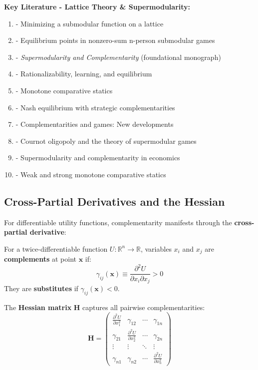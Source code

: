 \textbf{Key Literature - Lattice Theory \& Supermodularity:}
\begin{enumerate}[noitemsep]
    \item \citet{topkis1978} - Minimizing a submodular function on a lattice
    \item \citet{topkis1979} - Equilibrium points in nonzero-sum n-person submodular games
    \item \citet{topkis1998} - \textit{Supermodularity and Complementarity} (foundational monograph)
    \item \citet{milgrom1990} - Rationalizability, learning, and equilibrium
    \item \citet{milgrom1994} - Monotone comparative statics
    \item \citet{vives1990} - Nash equilibrium with strategic complementarities
    \item \citet{vives2005} - Complementarities and games: New developments
    \item \citet{amir1996} - Cournot oligopoly and the theory of supermodular games
    \item \citet{amir2005} - Supermodularity and complementarity in economics
    \item \citet{shannon1995} - Weak and strong monotone comparative statics
\end{enumerate}

\subsection{Cross-Partial Derivatives and the Hessian}
\label{subsec:cross-partial}

For differentiable utility functions, complementarity manifests through the \textbf{cross-partial derivative}:

\begin{definition}
For a twice-differentiable function $U: \mathbb{R}^n \to \mathbb{R}$, variables $x_i$ and $x_j$ are \textbf{complements} at point $\mathbf{x}$ if:
\begin{equation}
\gamma_{ij}(\mathbf{x}) \equiv \frac{\partial^2 U}{\partial x_i \partial x_j} > 0
\label{eq:local-complementarity}
\end{equation}
They are \textbf{substitutes} if $\gamma_{ij}(\mathbf{x}) < 0$.
\end{definition}

The \textbf{Hessian matrix} $\mathbf{H}$ captures all pairwise complementarities:
\begin{equation}
\mathbf{H} = \begin{pmatrix}
\frac{\partial^2 U}{\partial x_1^2} & \gamma_{12} & \cdots & \gamma_{1n} \\
\gamma_{21} & \frac{\partial^2 U}{\partial x_2^2} & \cdots & \gamma_{2n} \\
\vdots & \vdots & \ddots & \vdots \\
\gamma_{n1} & \gamma_{n2} & \cdots & \frac{\partial^2 U}{\partial x_n^2}
\end{pmatrix}
\label{eq:hessian}
\end{equation}


